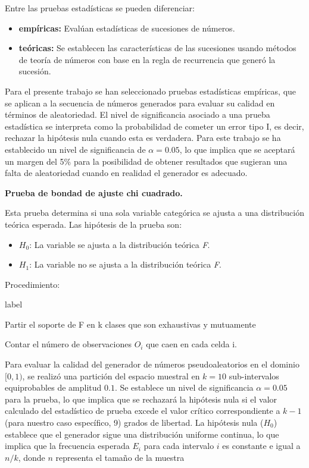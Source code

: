 \documentclass{article}
\begin{document}
Entre las pruebas estadísticas se pueden diferenciar:

\begin{itemize}
  \item \textbf{empíricas:} Evalúan estadísticas de sucesiones de números.
  \item \textbf{teóricas:} Se establecen las características de las sucesiones usando métodos de teoría de números con base en la regla de recurrencia que generó la sucesión.
\end{itemize}

Para el presente trabajo se han seleccionado pruebas estadísticas empíricas, que se aplican a la secuencia de números generados para evaluar su calidad en términos de aleatoriedad.
El nivel de significancia asociado a una prueba estadística se interpreta como la probabilidad de cometer un error tipo I, es decir, rechazar la hipótesis nula cuando esta es verdadera. Para este trabajo se ha establecido un nivel de significancia de $\alpha = 0.05$, lo que implica que se aceptará un margen del 5\% para la posibilidad de obtener resultados que sugieran una falta de aleatoriedad cuando en realidad el generador es adecuado.

\textbf{Prueba de bondad de ajuste chi cuadrado.}

Esta prueba determina si una sola variable categórica se ajusta a una distribución teórica esperada.
Las hipótesis de la prueba son:
\begin{itemize}
  \item $H_0$: La variable se ajusta a la distribución teórica \textit{F}.
  \item $H_1$: La variable no se ajusta a la distribución teórica \textit{F}.
\end{itemize}

Procedimiento:
\begin{list}{label}{}
  \item [1.] Partir el soporte de F en k clases que son exhaustivas y mutuamente
  \item [2.] Contar el número de observaciones $O_i$ que caen en cada celda i.
\end{list}

Para evaluar la calidad del generador de números pseudoaleatorios en el dominio $[0, 1)$, se realizó una partición del espacio muestral en $k=10$ sub-intervalos equiprobables de amplitud $0.1$.
Se establece un nivel de significancia $\alpha = 0.05$ para la prueba, lo que implica que se rechazará la hipótesis nula si el valor calculado del estadístico de prueba excede el valor crítico correspondiente a $k-1$ (para nuestro caso específico, 9) grados de libertad.
La hipótesis nula ($H_0$) establece que el generador sigue una distribución uniforme continua, lo que implica que la frecuencia esperada $E_i$ para cada intervalo $i$ es constante e igual a $n/k$, donde $n$ representa el tamaño de la muestra
\end{document}
